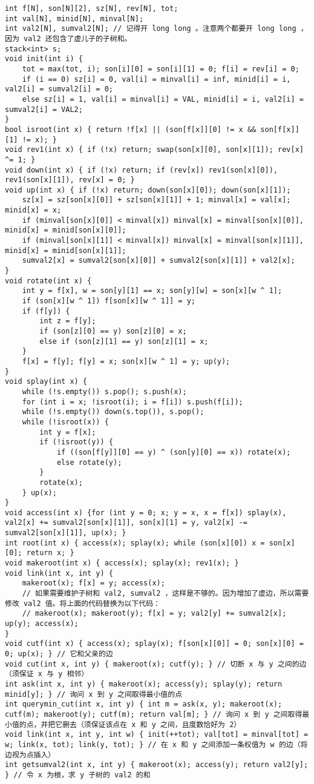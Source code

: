 \documentclass[landscape,a4paper]{article}
\begin{document}
\begin{lstlisting}
int f[N], son[N][2], sz[N], rev[N], tot;
int val[N], minid[N], minval[N];
int val2[N], sumval2[N]; // 记得开 long long 。注意两个都要开 long long ，因为 val2 还包含了虚儿子的子树和。
stack<int> s;
void init(int i) {
	tot = max(tot, i); son[i][0] = son[i][1] = 0; f[i] = rev[i] = 0;
	if (i == 0) sz[i] = 0, val[i] = minval[i] = inf, minid[i] = i, val2[i] = sumval2[i] = 0;
	else sz[i] = 1, val[i] = minval[i] = VAL, minid[i] = i, val2[i] = sumval2[i] = VAL2;
}
bool isroot(int x) { return !f[x] || (son[f[x]][0] != x && son[f[x]][1] != x); }
void rev1(int x) { if (!x) return; swap(son[x][0], son[x][1]); rev[x] ^= 1; }
void down(int x) { if (!x) return; if (rev[x]) rev1(son[x][0]), rev1(son[x][1]), rev[x] = 0; }
void up(int x) { if (!x) return; down(son[x][0]); down(son[x][1]);
	sz[x] = sz[son[x][0]] + sz[son[x][1]] + 1; minval[x] = val[x]; minid[x] = x;
	if (minval[son[x][0]] < minval[x]) minval[x] = minval[son[x][0]], minid[x] = minid[son[x][0]];
	if (minval[son[x][1]] < minval[x]) minval[x] = minval[son[x][1]], minid[x] = minid[son[x][1]];
	sumval2[x] = sumval2[son[x][0]] + sumval2[son[x][1]] + val2[x];
}
void rotate(int x) {
	int y = f[x], w = son[y][1] == x; son[y][w] = son[x][w ^ 1];
	if (son[x][w ^ 1]) f[son[x][w ^ 1]] = y;
	if (f[y]) {
		int z = f[y];
		if (son[z][0] == y) son[z][0] = x;
		else if (son[z][1] == y) son[z][1] = x;
	}
	f[x] = f[y]; f[y] = x; son[x][w ^ 1] = y; up(y);
}
void splay(int x) {
	while (!s.empty()) s.pop(); s.push(x);
	for (int i = x; !isroot(i); i = f[i]) s.push(f[i]);
	while (!s.empty()) down(s.top()), s.pop();
	while (!isroot(x)) {
		int y = f[x];
		if (!isroot(y)) {
			if ((son[f[y]][0] == y) ^ (son[y][0] == x)) rotate(x);
			else rotate(y);
		}
		rotate(x);
	} up(x);
}
void access(int x) {for (int y = 0; x; y = x, x = f[x]) splay(x), val2[x] += sumval2[son[x][1]], son[x][1] = y, val2[x] -= sumval2[son[x][1]], up(x); }
int root(int x) { access(x); splay(x); while (son[x][0]) x = son[x][0]; return x; }
void makeroot(int x) { access(x); splay(x); rev1(x); }
void link(int x, int y) {
	makeroot(x); f[x] = y; access(x);
	// 如果需要维护子树和 val2, sumval2 ，这样是不够的。因为增加了虚边，所以需要修改 val2 值。将上面的代码替换为以下代码：
	// makeroot(x); makeroot(y); f[x] = y; val2[y] += sumval2[x]; up(y); access(x);
}
void cutf(int x) { access(x); splay(x); f[son[x][0]] = 0; son[x][0] = 0; up(x); } // 它和父亲的边
void cut(int x, int y) { makeroot(x); cutf(y); } // 切断 x 与 y 之间的边（须保证 x 与 y 相邻）
int ask(int x, int y) { makeroot(x); access(y); splay(y); return minid[y]; } // 询问 x 到 y 之间取得最小值的点
int querymin_cut(int x, int y) { int m = ask(x, y); makeroot(x); cutf(m); makeroot(y); cutf(m); return val[m]; } // 询问 x 到 y 之间取得最小值的点，并把它删去（须保证该点在 x 和 y 之间，且度数恰好为 2）
void link(int x, int y, int w) { init(++tot); val[tot] = minval[tot] = w; link(x, tot); link(y, tot); } // 在 x 和 y 之间添加一条权值为 w 的边（将边视为点插入）
int getsumval2(int x, int y) { makeroot(x); access(y); return val2[y]; } // 令 x 为根，求 y 子树的 val2 的和
\end{lstlisting}
\end{document}

